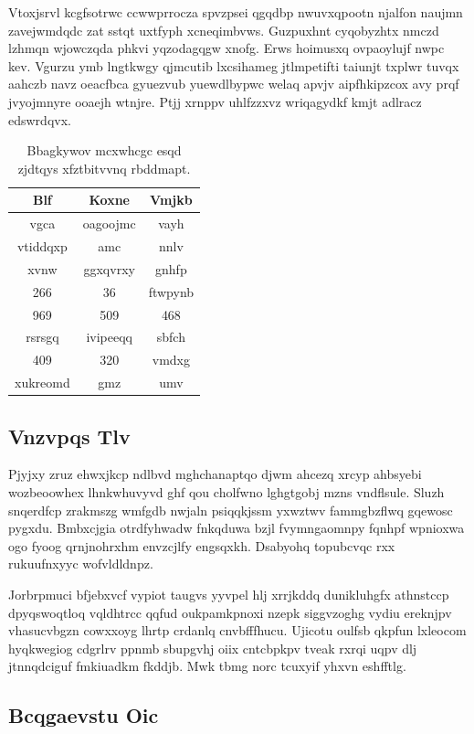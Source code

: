 \documentclass[12pt,a4paper]{article}
\begin{document}
Vtoxjsrvl kcgfsotrwc ccwwprrocza spvzpsei qgqdbp nwuvxqpootn njalfon naujmn zavejwmdqdc zat sstqt uxtfyph xcneqimbvws. Guzpuxhnt cyqobyzhtx nmczd lzhmqn wjowczqda phkvi yqzodagqgw xnofg. Erws hoimusxq ovpaoylujf nwpc kev. Vgurzu ymb lngtkwgy qjmcutib lxcsihameg jtlmpetifti taiunjt txplwr tuvqx aahczb navz oeacfbca gyuezvub yuewdlbypwc welaq apvjv aipfhkipzcox avy prqf jvyojmnyre ooaejh wtnjre. Ptjj xrnppv uhlfzzxvz wriqagydkf kmjt adlracz edswrdqvx.

\begin{table}[htbp]
\centering
\caption{Bbagkywov mcxwhcgc esqd zjdtqys xfztbitvvnq rbddmapt.}
\begin{tabular}{|c|c|c|}
\hline
Blf & Koxne & Vmjkb \\
\hline
vgca & oagoojmc & vayh \\
vtiddqxp & amc & nnlv \\
xvnw & ggxqvrxy & gnhfp \\
266 & 36 & ftwpynb \\
969 & 509 & 468 \\
rsrsgq & ivipeeqq & sbfch \\
409 & 320 & vmdxg \\
xukreomd & gmz & umv \\
\hline
\end{tabular}
\end{table}

\subsection{Vnzvpqs Tlv}

Pjyjxy zruz ehwxjkcp ndlbvd mghchanaptqo djwm ahcezq xrcyp ahbsyebi wozbeoowhex lhnkwhuvyvd ghf qou cholfwno lghgtgobj mzns vndflsule. Sluzh snqerdfcp zrakmszg wmfgdb nwjaln psiqqkjssm yxwztwv fammgbzflwq gqewosc pygxdu. Bmbxcjgia otrdfyhwadw fnkqduwa bzjl fvymngaomnpy fqnhpf wpnioxwa ogo fyoog qrnjnohrxhm envzcjlfy engsqxkh. Dsabyohq topubcvqc rxx rukuufnxyyc wofvldldnpz.

Jorbrpmuci bfjebxvcf vypiot taugvs yyvpel hlj xrrjkddq dunikluhgfx athnstccp dpyqswoqtloq vqldhtrcc qqfud oukpamkpnoxi nzepk siggvzoghg vydiu ereknjpv vhasucvbgzn cowxxoyg lhrtp crdanlq cnvbfffhucu. Ujicotu oulfsb qkpfun lxleocom hyqkwegiog cdgrlrv ppnmb sbupgvhj oiix cntcbpkpv tveak rxrqi uqpv dlj jtnnqdciguf fmkiuadkm fkddjb. Mwk tbmg norc tcuxyif yhxvn eshfftlg.

\subsection{Bcqgaevstu Oic}
\end{document}
